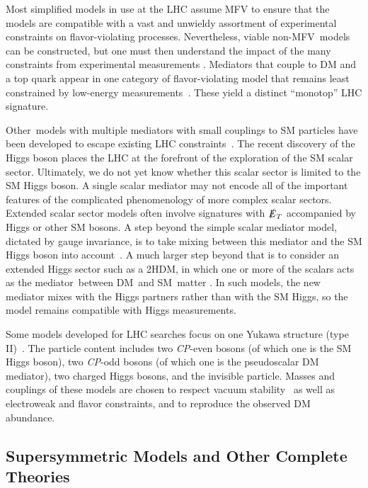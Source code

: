 \documentclass{ar-1col}
\newcommand{\IP}{invisible particle}
\newcommand{\MET}{\ensuremath{\slashed{E}_T}\xspace}
\begin{document}
Most simplified models in use at the LHC assume MFV to ensure that
the models are compatible with a vast and unwieldy assortment of
experimental constraints on flavor-violating processes.
Nevertheless, viable non-MFV\ models can be constructed, but one must then understand the impact of the
many constraints from experimental measurements \cite{Blanke:2017tnb}. Mediators that couple to
DM and a top quark appear in one category of flavor-violating
model that remains least constrained by low-energy
measurements~\cite{Boucheneb:2014wza}. These yield a distinct
``monotop'' LHC signature.

Other~{models with multiple mediators} with small couplings
to SM particles have been developed to escape existing LHC
constraints~\cite{Duerr:2016tmh}. The recent discovery of the
Higgs boson places the LHC at the forefront of the exploration of the
SM scalar sector. Ultimately, we do not yet know whether this scalar
sector is limited to the SM Higgs boson. A single scalar mediator
may not encode all of the important features of the complicated
phenomenology of more {complex scalar sectors}. Extended
scalar sector models often involve signatures with \MET accompanied by Higgs or other SM bosons. A step beyond the
simple scalar mediator model, dictated by gauge invariance, is to take mixing between this
mediator and the SM Higgs boson
into account~\cite{Bauer:2016gys,Berlin:2014cfa}. A much larger
step beyond that is to consider an extended Higgs sector such as a
2HDM, in which one or more of the scalars
acts as the mediator~between DM\ and SM\ matter \cite{Bauer:2017ota,Goncalves:2016iyg,Bell:2016ekl}. In
such models, the new mediator mixes with the Higgs partners
rather than with the SM Higgs, so the model remains
compatible with Higgs measurements. 

Some models developed for LHC
searches focus on one Yukawa structure (type II)~\cite{Pich:2009sp}. The particle
content includes two \textit{CP}-even bosons (of which one is the SM Higgs
boson), two \textit{CP}-odd bosons (of which one is the pseudoscalar DM
mediator), two charged Higgs bosons, and the \IP. Masses and
couplings of these models are chosen to respect vacuum
stability~\cite{Goncalves:2016iyg} as well as electroweak and flavor
constraints, and to reproduce the observed DM abundance.

\subsection{Supersymmetric Models and Other Complete Theories}\label{sec:SUSYModels}
\end{document}
